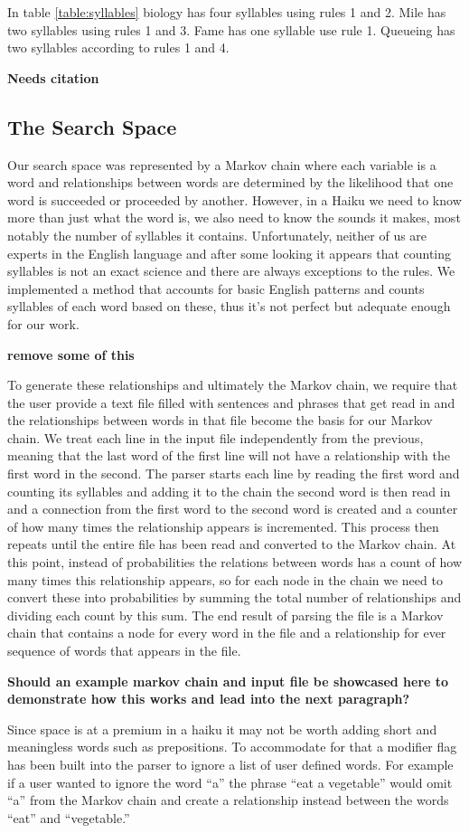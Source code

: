 \documentclass[]{article}
\newcommand{\comment}[1]
{\par {\bfseries \color{green} #1 \par}}
\begin{document}
In table \ref{table:syllables} biology has four syllables using rules 1 and 2. Mile has two syllables using rules 1 and 3. Fame has one syllable use rule 1. Queueing has two syllables according to rules 1 and 4. \comment{Needs citation}
\subsection{The Search Space}
Our search space was represented by a Markov chain where each variable is a word and relationships between words are determined by the likelihood that one word is succeeded or proceeded by another. However, in a Haiku we need to know more than just what the word is, we also need to know the sounds it makes, most notably the number of syllables it contains. Unfortunately, neither of us are experts in the English language and after some looking it appears that counting syllables is not an exact science and there are always exceptions to the rules. We implemented a method that accounts for basic English patterns and counts syllables of each word based on these, thus it's not perfect but adequate enough for our work.\comment{remove some of this}

To generate these relationships and ultimately the Markov chain, we require that the user provide a text file filled with sentences and phrases that get read in and the relationships between words in that file become the basis for our Markov chain. We treat each line in the input file independently from the previous, meaning that the last word of the first line will not have a relationship with the first word in the second. The parser starts each line by reading the first word and counting its syllables and adding it to the chain the second word is then read in and a connection from the first word to the second word is created and a counter of how many times the relationship appears is incremented. This process then repeats until the entire file has been read and converted to the Markov chain. At this point, instead of probabilities the relations between words has a count of how many times this relationship appears, so for each node in the chain we need to convert these into probabilities by summing the total number of relationships and dividing each count by this sum. The end result of parsing the file is a Markov chain that contains a node for every word in the file and a relationship for ever sequence of words that appears in the file.
\comment{Should an example markov chain and input file be showcased here to demonstrate how this works and lead into the next paragraph?}
Since space is at a premium in a haiku it may not be worth adding short and meaningless words such as prepositions. To accommodate for that a modifier flag has been built into the parser to ignore a list of user defined words. For example if a user wanted to ignore the word ``a'' the phrase ``eat a vegetable'' would omit ``a'' from the Markov chain and create a relationship instead between the words ``eat'' and ``vegetable.''
\end{document}
